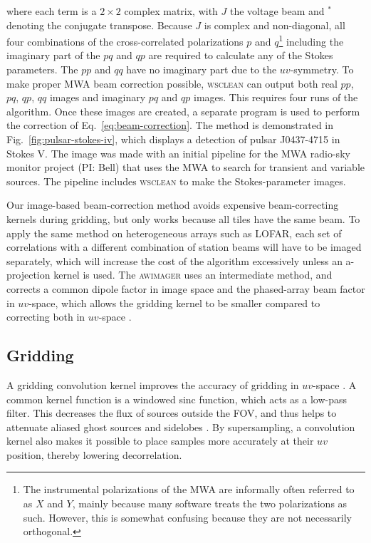 \documentclass[useAMS,usenatbib]{mn2e}
\begin{document}
where each term is a $2\times2$ complex matrix, with $J$ the voltage beam and $^*$ denoting the conjugate transpose. Because $J$ is complex and non-diagonal, all four combinations of the cross-correlated polarizations $p$ and $q$\footnote{The instrumental polarizations of the MWA are informally often referred to as $X$ and $Y$, mainly because many software treats the two polarizations as such. However, this is somewhat confusing because they are not necessarily orthogonal.} including the imaginary part of the $pq$ and $qp$ are required to calculate any of the Stokes parameters. The $pp$ and $qq$ have no imaginary part due to the $uv$-symmetry. To make proper MWA beam correction possible, \textsc{wsclean} can output both real $pp$, $pq$, $qp$, $qq$ images and imaginary $pq$ and $qp$ images. This requires four runs of the algorithm. Once these images are created, a separate program is used to perform the correction of Eq.~\eqref{eq:beam-correction}. The method is demonstrated in Fig.~\ref{fig:pulsar-stokes-iv}, which displays a detection of pulsar J0437-4715 in Stokes V. The image was made with an initial pipeline for the MWA radio-sky monitor project (PI: Bell) that uses the MWA to search for transient and variable sources. The pipeline includes \textsc{wsclean} to make the Stokes-parameter images.

Our image-based beam-correction method avoids expensive beam-correcting kernels during gridding, but only works because all tiles have the same beam. To apply the same method on heterogeneous arrays such as LOFAR, each set of correlations with a different combination of station beams will have to be imaged separately, which will increase the cost of the algorithm excessively unless an a-projection kernel is used. The \textsc{awimager} uses an intermediate method, and corrects a common dipole factor in image space and the phased-array beam factor in $uv$-space, which allows the gridding kernel to be smaller compared to correcting both in $uv$-space \citep{awimager-2013}.

\subsection{Gridding} \label{sec:gridding}
A gridding convolution kernel improves the accuracy of gridding in $uv$-space \citep{optimal-gridding-schwab-1983}. A common kernel function is a windowed sinc function, which acts as a low-pass filter. This decreases the flux of sources outside the FOV, and thus helps to attenuate aliased ghost sources and sidelobes \citep{post-correlation-filtering}. By supersampling, a convolution kernel also makes it possible to place samples more accurately at their $uv$ position, thereby lowering decorrelation.
\end{document}
